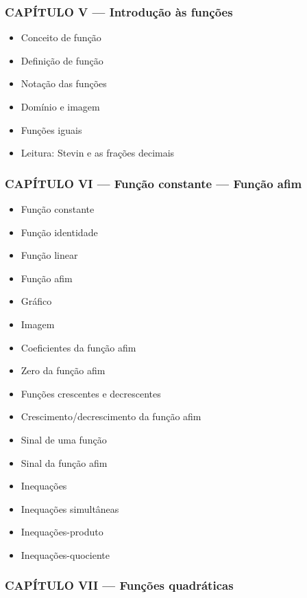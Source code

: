 \documentclass[a4paper,12pt]{article}[abntex2]
\begin{document}
\subsubsection*{CAPÍTULO V — Introdução às funções}

\begin{itemize}
\item Conceito de função
\item Definição de função
\item Notação das funções
\item Domínio e imagem
\item Funções iguais
\item Leitura: Stevin e as frações decimais
\end{itemize}
\subsubsection*{CAPÍTULO VI — Função constante — Função afim}

\begin{itemize}
\item Função constante
\item Função identidade
\item Função linear
\item Função afim
\item Gráfico
\item Imagem
\item Coeficientes da função afim
\item Zero da função afim
\item Funções crescentes e decrescentes
\item Crescimento/decrescimento da função afim
\item Sinal de uma função
\item Sinal da função afim
\item Inequações
\item Inequações simultâneas
\item Inequações-produto
\item Inequações-quociente
\end{itemize}
\subsubsection*{CAPÍTULO VII — Funções quadráticas}
\end{document}
